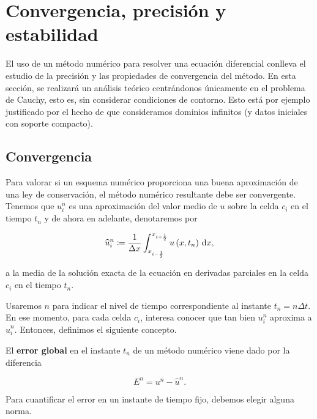 \chapter{Convergencia, precisión y estabilidad}\label{ch:convergence}

El uso de un método numérico para resolver una ecuación diferencial
conlleva el estudio de la precisión y las propiedades de convergencia
del método.
En esta sección, se realizará un análisis teórico centrándonos
únicamente en el problema de Cauchy, esto es, sin considerar
condiciones de contorno.
Esto está por ejemplo justificado por el hecho de que consideramos
dominios infinitos (y datos iniciales con soporte compacto).

\section{Convergencia}

Para valorar si un esquema numérico proporciona una buena
aproximación de una ley de conservación, el método numérico
resultante debe ser convergente.
Tenemos que $u^{n}_{i}$ es una aproximación del valor medio de $u$
sobre la celda $c_{i}$ en el tiempo $t_{n}$ y de ahora en adelante,
denotaremos por

\begin{equation*}
  \widehat{u}^{n}_{i}\coloneqq
  \frac{1}{\Delta x}
  \int_{x_{i-\frac{1}{2}}}^{x_{i+\frac{1}{2}}}
  u\left(x,t_{n}\right)\dl x,
\end{equation*}

a la media de la solución exacta de la ecuación en derivadas
parciales en la celda $c_{i}$ en el tiempo $t_{n}$.

Usaremos $n$ para indicar el nivel de tiempo correspondiente al
instante $t_{n}=n\Delta t$.
En ese momento, para cada celda $c_{i}$, interesa conocer que tan
bien $u^{n}_{i}$ aproxima a $\widehat{u}^{n}_{i}$.
Entonces, definimos el siguiente concepto.

\begin{definition}
  El \textbf{error global} en el instante $t_{n}$ de un método
  numérico viene dado por la diferencia

  \begin{equation*}
    E^{n}=
    u^{n}-
    \widehat{u}^{n}.
  \end{equation*}

  Para cuantificar el error en un instante de tiempo fijo, debemos
  elegir alguna norma.
\end{definition}

